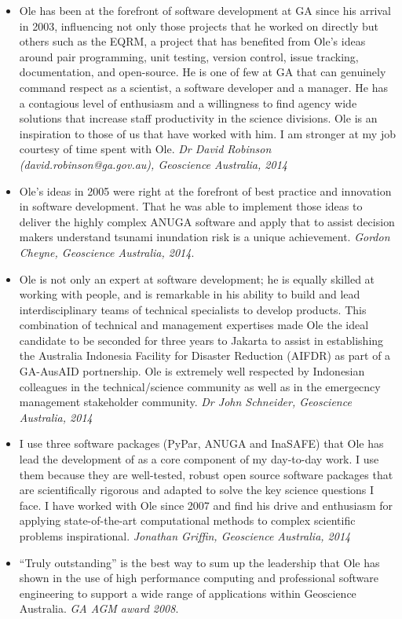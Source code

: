\documentclass[11pt,a4paper]{article}
\begin{document}
\begin{itemize}
  \item Ole has been at the forefront of software development at GA since his arrival in 2003, influencing not only those projects that he worked on directly but others such as the EQRM, a project that has benefited from Ole’s ideas around pair programming, unit testing, version control, issue tracking, documentation, and open-source. He is one of few at GA that can genuinely command respect as a scientist, a software developer and a manager.  He has a contagious level of enthusiasm and a willingness to find agency wide solutions that increase staff productivity in the science divisions. Ole is an inspiration to those of us that have worked with him. I am stronger at my job courtesy of time spent with Ole.
  \emph{Dr David Robinson (david.robinson@ga.gov.au), Geoscience Australia, 2014}
  \item Ole’s ideas in 2005 were right at the forefront of best practice and innovation in software development. That he was able to implement those ideas to deliver the highly complex ANUGA software and apply that to assist decision makers understand tsunami inundation risk is a unique achievement. \emph{Gordon Cheyne, Geoscience Australia, 2014}.
  \item Ole is not only an expert at software development; he is equally skilled at working with people, and is remarkable in his ability to build and lead interdisciplinary teams of technical specialists to develop products. This combination of technical and management expertises made Ole the ideal candidate to be seconded for three years to Jakarta to assist in establishing the Australia Indonesia Facility for Disaster Reduction (AIFDR) as part of a GA-AusAID portnership. Ole is extremely well respected by Indonesian colleagues in the technical/science community as well as in the emergecncy management stakeholder community. \emph{Dr John Schneider, Geoscience Australia, 2014}
  \item I use three software packages (PyPar, ANUGA and InaSAFE) that Ole has lead the development of as a core component of my day-to-day work. I use them because they are well-tested, robust open source software packages that are scientifically rigorous and adapted to solve the key science questions I face. I have worked with Ole since 2007 and find his drive and enthusiasm for applying state-of-the-art computational methods to complex scientific problems inspirational. \emph{Jonathan Griffin, Geoscience Australia, 2014}
  \item “Truly outstanding” is the best way to sum up the leadership that Ole has shown in the use of high performance computing and professional software engineering to support a wide range of applications within Geoscience Australia. \emph{GA AGM award 2008}.

\end{itemize}
\end{document}
